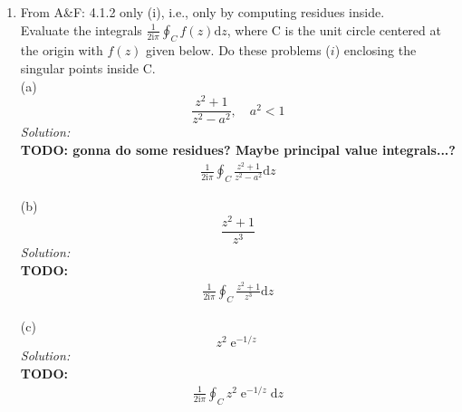 \documentclass[10pt]{amsart}
\newcommand{\D}{\mathrm{d}}
\newcommand{\I}{\mathrm{i}}
\DeclareMathOperator{\E}{e}
\theoremstyle{nonumberplain}
\begin{document}
\mline
\begin{enumerate}[label={\bf {\arabic*}:}]
\item From A\&F: 4.1.2 only (i), i.e., only by computing residues inside.\\
Evaluate the integrals $\frac 1 {2 \I \pi} \oint_C f(z) \D z$, where C is the unit circle centered at the origin with $f(z)$ given below.
Do these problems ($i$) enclosing the singular points inside C. \\

\noindent
(a)
$$
\frac {z^2 + 1}{ z^2 - a^2 }, \quad a^2 < 1
$$
\textit{Solution:} \\
\textbf{TODO: gonna do some residues? Maybe principal value integrals...?}
\begin{align*}
\frac 1 {2 \I \pi} \oint_C \frac {z^2 + 1}{ z^2 - a^2 } \D z
\end{align*}

\noindent
(b)
$$
\frac {z^2 + 1}{ z^3 }
$$
\textit{Solution:} \\
\textbf{TODO:}
\begin{align*}
\frac 1 {2 \I \pi} \oint_C \frac {z^2 + 1}{ z^3 } \D z
\end{align*}

\noindent
(c)
$$
z^2\E^{-1/z}
$$
\textit{Solution:} \\
\textbf{TODO:}
\begin{align*}
\frac 1 {2 \I \pi} \oint_C z^2\E^{-1/z} \D z
\end{align*}

\newpage



\end{enumerate}
\end{document}
